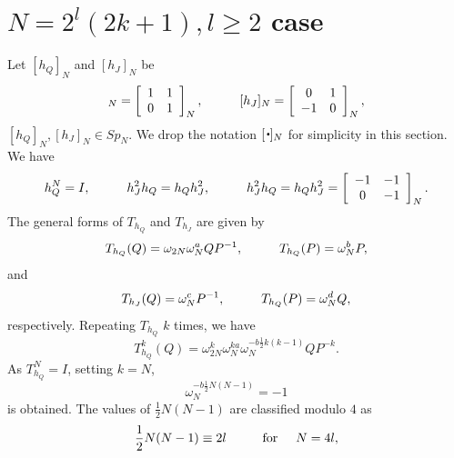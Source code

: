 \documentclass[12pt]{iopart}
\newcommand{\sbt}{\,\begin{picture}(-1,1)(-1,-3)\circle*{2}\end{picture}\ }
\begin{document}
\section{\(N=2^l(2k+1),l\ge2\) case}


Let \([h_Q]_N\) and \([h_J]_N\) be
\begin{equation}
[h_Q]_N
=
\left[\begin{array}{cc}
1 & 1 \\
0 & 1 \\
\end{array}\right]_N,
\hspace{10mm}
[h_J]_N
=
\left[\begin{array}{cc}
0 & 1 \\
-1 & 0 \\
\end{array}\right]_N,
\end{equation}
\([h_Q]_N,[h_J]_N\in Sp_N\).
%
We drop the notation \([\sbt]_N\) for simplicity in this section.
We have
\begin{equation}
h_Q^N=I,
\hspace{10mm}
h_J^2h_Q=h_Qh_J^2,
\hspace{10mm}
h_J^2h_Q=h_Qh_J^2
=
\left[\begin{array}{cc}
-1 & -1 \\
 0 & -1 \\
\end{array}\right]_N.
\end{equation}
%
The general forms of \(T_{h_Q}\) and \(T_{h_J}\) are given by
\begin{equation}
T_{h_Q}(Q)=\omega_{2N}\omega_N^aQP^{-1},
\hspace{10mm}
T_{h_Q}(P)=\omega_N^bP,
\end{equation}
and
\begin{equation}
T_{h_J}(Q)=\omega_N^cP^{-1},
\hspace{10mm}
T_{h_Q}(P)=\omega_N^dQ,
\end{equation}
respectively. Repeating \(T_{h_Q}\) \(k\) times, we have
\begin{equation}
T_{h_Q}^k(Q)
=
\omega_{2N}^k\omega_N^{ka}\omega_N^{-b\frac12k(k-1)}QP^{-k}.
\end{equation}
%
As \(T_{h_Q}^N=I\), setting \(k=N\),
\begin{equation}
\omega_N^{-b\frac12N(N-1)}=-1
\end{equation}
is obtained.
%
The values of \(\displaystyle\frac12N(N-1)\) are classified modulo \(4\) as
\begin{equation}
\frac12N(N-1)\equiv2l
\hspace{10mm}
{\rm for}
\hspace{5mm}
N=4l,
\end{equation}
\end{document}
